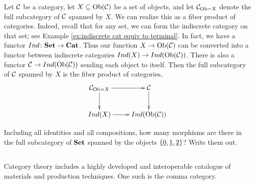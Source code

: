 \documentclass[CT4S-EN-RU]{subfiles}
\begin{document}
\begin{remarkRUS}
\end{remarkRUS}

\begin{exampleENG}
Let $\mathcal{C}$ be a category, let $X\subseteq\textnormal{Ob}(\mathcal{C})$ be a set of objects, and let $\mathcal{C}_{\textnormal{Ob}=X}$ denote the full subcategory of $\mathcal{C}$ spanned by $X$. We can realize this as a fiber product of categories. Indeed, recall that for any set, we can form the indiscrete category on that set; see Example \ref{ex:indiscrete cat equiv to terminal}. In fact, we have a functor $Ind\colon{\bf Set}\rightarrow{\bf Cat}$. Thus our function $X\rightarrow\textnormal{Ob}(\mathcal{C})$ can be converted into a functor between indiscrete categories $Ind(X)\rightarrow Ind(\textnormal{Ob}(\mathcal{C}))$. There is also a functor $\mathcal{C}\rightarrow Ind(\textnormal{Ob}(\mathcal{C}))$ sending each object to itself. Then the full subcategory of $\mathcal{C}$ spanned by $X$ is the fiber product of categories,
$$\xymatrix{\mcC_{\Ob=X}\ar[r]\ar[d]&\mcC\ar[d]\\Ind(X)\ar[r]&Ind(\Ob(\mcC))}$$
\end{exampleENG}

\begin{exampleRUS}
\end{exampleRUS}

\begin{exerciseENG}
Including all identities and all compositions, how many morphisms are there in the full subcategory of ${\bf Set}$ spanned by the objects $\{\underline{0},\underline{1},\underline{2}\}$? Write them out.
\end{exerciseENG}

\begin{exerciseRUS}
\end{exerciseRUS}


\subsection{}\label{sec:comma}

\begin{blockENG}
Category theory includes a highly developed and interoperable catalogue of materials and production techniques. One such is the comma category.
\end{blockENG}

\begin{blockRUS}
\end{blockRUS}
\end{document}
